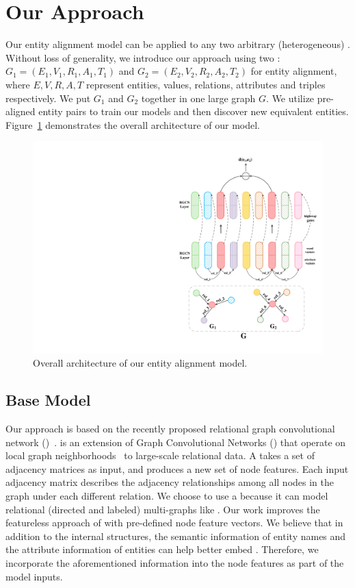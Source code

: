 
		\section{Our Approach}
	\label{section:app}
	Our entity alignment model can be applied to any two arbitrary (heterogeneous) \KGs. Without loss of generality, we introduce our approach using two \KGs: $G_1 = (E_1,V_1,R_1,A_1,T_1)$ and $G_2 = (E_2,V_2,R_2,A_2,T_2)$ for entity alignment, where
$E,V,R,A,T$ represent entities, values, relations, attributes and triples respectively.
	We put $G_1$ and $G_2$ together in one large graph $G$. We utilize pre-aligned entity pairs to train our models and then discover new
equivalent entities. Figure~\ref{all} demonstrates the overall architecture of our model.
	
	
	\begin{figure}[t!]
		\begin{center}
			\includegraphics[width=0.8\linewidth]{figures/graph2.pdf}
			\caption{Overall architecture of our entity alignment model.}
			\label{all}
		\end{center}
	\end{figure}
	
    \subsection{Base Model}
    Our approach is based on the recently proposed relational graph convolutional network (\RGCN)~\cite{Schlichtkrull2017Modeling}. 
    \RGCN is an extension of Graph Convolutional Networks (\GCNs) that operate on local graph neighborhoods~\cite{Duvenaud2015Convolutional,Kipf2016Semi} to large-scale relational data. 
    A \RGCN takes a set of adjacency matrices as input, and produces a new set of node features. 
    Each input adjacency matrix describes the adjacency relationships among all nodes in the graph under each different relation. 
    We choose to use a \RGCN because it can model relational (directed and labeled) multi-graphs like \KGs. 
    Our work improves the featureless approach of \RGCN with pre-defined node feature vectors. 
    We believe that in addition to the internal structures, the semantic information of entity names and the attribute information of entities can help \RGCN better embed \KGs. 
    Therefore, we incorporate the aforementioned information into the node features as part of the model inputs.


